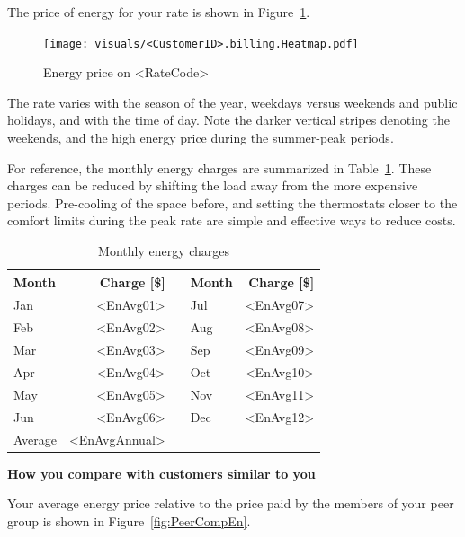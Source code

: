 \documentclass[10pt]{article}
\begin{document}
The price of energy for your rate is shown in Figure~\ref{fig:toumap}.
\begin{figure}[!h]
\centering
\texttt{[image: visuals/<CustomerID>.billing.Heatmap.pdf]}
\caption{Energy price on <RateCode>}
\label{fig:toumap}
\end{figure}
The rate varies with the season of the year, weekdays versus weekends and public holidays, and with the time of day.
Note the darker vertical stripes denoting the weekends, and the high energy price during the summer-peak periods.

For reference, the monthly energy charges are summarized in Table~\ref{tab:energy}.
These charges can be reduced by shifting the load away from the more expensive periods.
Pre-cooling of the space before, and setting the thermostats closer to the comfort limits during the peak rate are simple and effective ways to reduce costs.

\begin{table}[th!]
  \centering
  \caption{Monthly energy charges}
  \vspace{1.5ex}
  \label{tab:energy}
  \begin{tabular}{p{0.75in}rp{0.2in}p{0.75in}r}
    Month & Charge [\$] & & Month & Charge [\$] \\
    \midrule
    Jan & <EnAvg01> & & Jul & <EnAvg07> \\
    Feb & <EnAvg02> & & Aug & <EnAvg08> \\
    Mar & <EnAvg03> & & Sep & <EnAvg09> \\
    Apr & <EnAvg04> & & Oct & <EnAvg10> \\
    May & <EnAvg05> & & Nov & <EnAvg11> \\
    Jun & <EnAvg06> & & Dec & <EnAvg12> \\
    \midrule
    Average & <EnAvgAnnual> & & &
  \end{tabular}
\end{table}

\vspace{3ex}
\textbf{\Large How you compare with customers similar to you}
\vspace{1ex}

Your average energy price relative to the price paid by the members of your peer group is shown in Figure~\ref{fig:PeerCompEn}.
\end{document}
